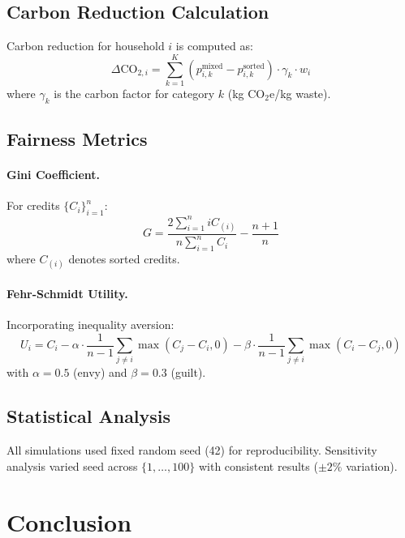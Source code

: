 \documentclass[12pt,a4paper]{article}
\begin{document}
\subsection{Carbon Reduction Calculation}

Carbon reduction for household $i$ is computed as:
\begin{equation}
\Delta \text{CO}_{2,i} = \sum_{k=1}^K (p_{i,k}^{\text{mixed}} - p_{i,k}^{\text{sorted}}) \cdot \gamma_k \cdot w_i
\end{equation}
where $\gamma_k$ is the carbon factor for category $k$ (kg CO$_2$e/kg waste).

\subsection{Fairness Metrics}

\paragraph{Gini Coefficient.} For credits $\{C_i\}_{i=1}^n$:
\begin{equation}
G = \frac{2\sum_{i=1}^n i C_{(i)}}{n\sum_{i=1}^n C_i} - \frac{n+1}{n}
\end{equation}
where $C_{(i)}$ denotes sorted credits.

\paragraph{Fehr-Schmidt Utility.} Incorporating inequality aversion\cite{fehr1999theory}:
\begin{equation}
U_i = C_i - \alpha \cdot \frac{1}{n-1}\sum_{j \neq i} \max(C_j - C_i, 0) - \beta \cdot \frac{1}{n-1}\sum_{j \neq i} \max(C_i - C_j, 0)
\end{equation}
with $\alpha=0.5$ (envy) and $\beta=0.3$ (guilt).

\subsection{Statistical Analysis}

All simulations used fixed random seed (42) for reproducibility. Sensitivity analysis varied seed across $\{1, \ldots, 100\}$ with consistent results ($\pm 2\%$ variation).

\section{Conclusion}
\end{document}
